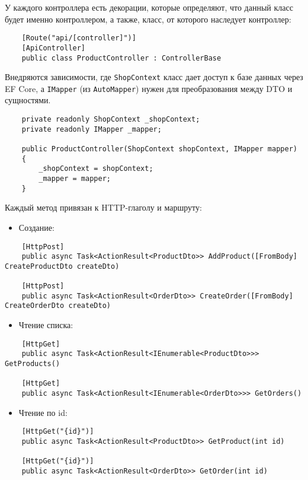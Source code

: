 \documentclass[a4paper,12pt]{report}
\begin{document}
У каждого контроллера есть декорации, которые определяют, что данный класс будет именно контроллером, 
а также, класс, от которого наследует контроллер:
\begin{verbatim}
    [Route("api/[controller]")]
    [ApiController]
    public class ProductController : ControllerBase
\end{verbatim}

Внедряются зависимости, где \texttt{ShopContext} класс дает доступ к базе данных через \acs{EF} Core, а \texttt{IMapper} (из \texttt{AutoMapper}) 
нужен для преобразования между \acs{DTO} и сущностями.
\begin{verbatim}
    private readonly ShopContext _shopContext;
    private readonly IMapper _mapper;
    
    public ProductController(ShopContext shopContext, IMapper mapper)
    {
        _shopContext = shopContext;
        _mapper = mapper;
    }    
\end{verbatim}

Каждый метод привязан к \acs{HTTP}-глаголу и маршруту:
\begin{itemize}
    \item Создание:
\end{itemize}

\begin{verbatim}
    [HttpPost]
    public async Task<ActionResult<ProductDto>> AddProduct([FromBody] CreateProductDto createDto)

    [HttpPost]
    public async Task<ActionResult<OrderDto>> CreateOrder([FromBody] CreateOrderDto createDto)
\end{verbatim}

\begin{itemize}
    \item Чтение списка:
\end{itemize}

\begin{verbatim}
    [HttpGet]
    public async Task<ActionResult<IEnumerable<ProductDto>>> GetProducts()

    [HttpGet]
    public async Task<ActionResult<IEnumerable<OrderDto>>> GetOrders()
\end{verbatim}

\begin{itemize}
    \item Чтение по id:
\end{itemize}

\begin{verbatim}
    [HttpGet("{id}")]
    public async Task<ActionResult<ProductDto>> GetProduct(int id)

    [HttpGet("{id}")]
    public async Task<ActionResult<OrderDto>> GetOrder(int id) 
\end{verbatim}
\end{document}
